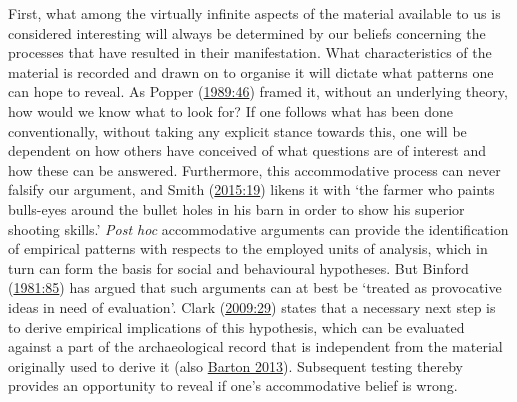 \documentclass[
  a4paper,
  oneside]{uiophdthesis}
\begin{document}
First, what among the virtually infinite aspects of the material available to us is considered interesting will always be determined by our beliefs concerning the processes that have resulted in their manifestation. What characteristics of the material is recorded and drawn on to organise it will dictate what patterns one can hope to reveal. As Popper (\protect\hyperlink{ref-popper1989}{1989:46}) framed it, without an underlying theory, how would we know what to look for? If one follows what has been done conventionally, without taking any explicit stance towards this, one will be dependent on how others have conceived of what questions are of interest and how these can be answered. Furthermore, this accommodative process can never falsify our argument, and Smith (\protect\hyperlink{ref-smith2015}{2015:19}) likens it with `the farmer who paints bulls-eyes around the bullet holes in his barn in order to show his superior shooting skills.' \emph{Post hoc} accommodative arguments can provide the identification of empirical patterns with respects to the employed units of analysis, which in turn can form the basis for social and behavioural hypotheses. But Binford (\protect\hyperlink{ref-binford1981}{1981:85}) has argued that such arguments can at best be `treated as provocative ideas in need of evaluation'. Clark (\protect\hyperlink{ref-clark2009}{2009:29}) states that a necessary next step is to derive empirical implications of this hypothesis, which can be evaluated against a part of the archaeological record that is independent from the material originally used to derive it (also \protect\hyperlink{ref-barton2013}{Barton 2013}). Subsequent testing thereby provides an opportunity to reveal if one's accommodative belief is wrong.
\end{document}
